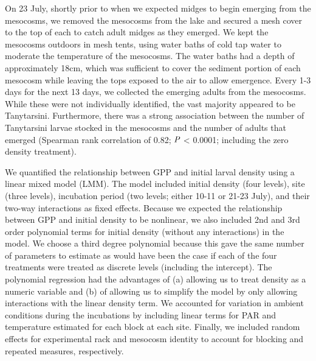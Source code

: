 On 23 July, shortly prior to when we expected midges to begin emerging from the mesocosms,
we removed the mesocosms from the lake and secured a mesh cover to the top of each
to catch adult midges as they emerged. 
We kept the mesocosms outdoors in mesh tents,
using water baths of cold tap water to moderate the temperature of the mesocosms.
The water baths had a depth of approximately 18cm,
which was sufficient to cover the sediment portion of each mesocosm while leaving the
tops exposed to the air to allow emergence.
Every 1-3 days for the next 13 days, we collected the emerging adults from the mesocosms.
While these were not individually identified, the vast majority appeared to be Tanytarsini.
Furthermore, there was a strong association between the number of Tanytarsini larvae 
stocked in the mesocosms and the number of adults that emerged 
(Spearman rank correlation of 0.82; $\emph{P}$ < 0.0001; including the zero density treatment).

We quantified the relationship between GPP and initial larval density using a 
linear mixed model (LMM). 
The model included initial density (four levels), site (three levels),
incubation period (two levels; either 10-11 or 21-23 July), 
and their two-way interactions as fixed effects.
Because we expected the relationship between GPP and initial density to be nonlinear,
we also included 2nd and 3rd order polynomial terms for initial density 
(without any interactions) in the model.
We choose a third degree polynomial because this gave the same number of parameters 
to estimate as would have been the case if each of the four treatments were treated as discrete
levels (including the intercept). 
The polynomial regression had the advantages of 
(a) allowing us to treat density as a numeric
variable and 
(b) of allowing us to simplify the model by only allowing interactions with the linear
density term.
We accounted for variation in ambient conditions during the incubations by including
linear terms for PAR and temperature estimated for each block at each site.
Finally, we included random effects for experimental rack and mesocosm identity to account
for blocking and repeated measures, respectively.

